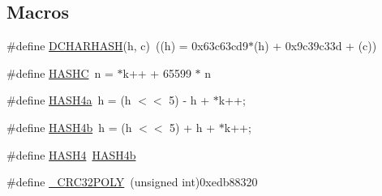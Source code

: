 \subsection*{Macros}
\begin{DoxyCompactItemize}
\item 
\#define \mbox{\hyperlink{adat-devel_2other__libs_2filedb_2filehash_2ffdb__hash__func_8c_ae15122ac6220a318b9ef4749a126cf68}{D\+C\+H\+A\+R\+H\+A\+SH}}(h,  c)~((h) = 0x63c63cd9$\ast$(h) + 0x9c39c33d + (c))
\item 
\#define \mbox{\hyperlink{adat-devel_2other__libs_2filedb_2filehash_2ffdb__hash__func_8c_aeb7071778435a4016d53d10393cd3b47}{H\+A\+S\+HC}}~n = $\ast$k++ + 65599 $\ast$ n
\item 
\#define \mbox{\hyperlink{adat-devel_2other__libs_2filedb_2filehash_2ffdb__hash__func_8c_a1d4d5ee3749a80aa05748bbab4eb9c48}{H\+A\+S\+H4a}}~h = (h $<$$<$ 5) -\/ h + $\ast$k++;
\item 
\#define \mbox{\hyperlink{adat-devel_2other__libs_2filedb_2filehash_2ffdb__hash__func_8c_a68b868dbd30d0244d8d815316b0983e2}{H\+A\+S\+H4b}}~h = (h $<$$<$ 5) + h + $\ast$k++;
\item 
\#define \mbox{\hyperlink{adat-devel_2other__libs_2filedb_2filehash_2ffdb__hash__func_8c_a7740ad2d66952fc26f801a9dcf76bae5}{H\+A\+S\+H4}}~\mbox{\hyperlink{adat__devel_2other__libs_2filedb_2filehash_2ffdb__hash__func_8c_a68b868dbd30d0244d8d815316b0983e2}{H\+A\+S\+H4b}}
\item 
\#define \mbox{\hyperlink{adat-devel_2other__libs_2filedb_2filehash_2ffdb__hash__func_8c_a7fdf299d5deb2577876427d08aa22999}{\+\_\+\+C\+R\+C32\+P\+O\+LY}}~(unsigned int)0xedb88320
\end{DoxyCompactItemize}
